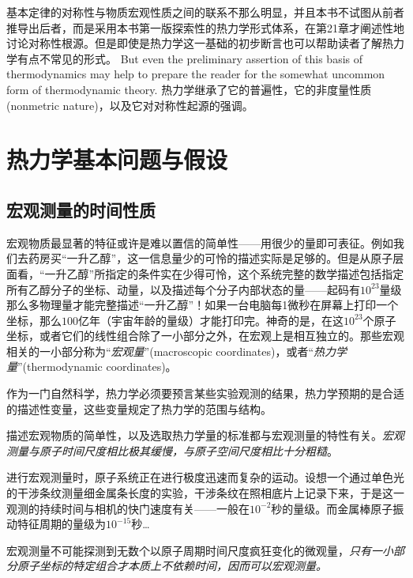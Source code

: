 基本定律的对称性与物质宏观性质之间的联系不那么明显，并且本书不试图从前者推导出后者，而是采用本书第一版探索性的热力学形式体系，在第21章才阐述性地讨论对称性根源。但是即使是热力学这一基础的初步断言也可以帮助读者了解热力学有点不常见的形式。{\color{red} But even the preliminary assertion of this basis of thermodynamics may help to prepare the reader for the somewhat uncommon form of thermodynamic theory.}  热力学继承了它的普遍性，它的非度量性质(nonmetric nature)，以及它对对称性起源的强调。

\chapter{热力学基本问题与假设}
\label{chap1}
\section{宏观测量的时间性质}
\label{sec1.1}
宏观物质最显著的特征或许是难以置信的简单性——用很少的量即可表征。例如我们去药房买“一升乙醇”，这一信息量少的可怜的描述实际是足够的。但是从原子层面看，“一升乙醇”所指定的条件实在少得可怜，这个系统完整的数学描述包括指定所有乙醇分子的坐标、动量，以及描述每个分子内部状态的量——起码有$10^{23}$量级那么多物理量才能完整描述“一升乙醇”！如果一台电脑每1微秒在屏幕上打印一个坐标，那么$100$亿年（宇宙年龄的量级）才能打印完。神奇的是，在这$10^{23}$个原子坐标，或者它们的线性组合除了一小部分之外，在宏观上是相互独立的。那些宏观相关的一小部分称为“{\it 宏观量}”(macroscopic coordinates)，或者“{\it 热力学量}”(thermodynamic coordinates)。

作为一门自然科学，热力学必须要预言某些实验观测的结果，热力学预期的是合适的描述性变量，这些变量规定了热力学的范围与结构。

描述宏观物质的简单性，以及选取热力学量的标准都与宏观测量的特性有关。{\it 宏观测量与原子时间尺度相比极其缓慢，与原子空间尺度相比十分粗糙}。

进行宏观测量时，原子系统正在进行极度迅速而复杂的运动。设想一个通过单色光的干涉条纹测量细金属条长度的实验，干涉条纹在照相底片上记录下来，于是这一观测的持续时间与相机的快门速度有关——一般在$10^{-2}$秒的量级。而金属棒原子振动特征周期的量级为$10^{-15}$秒…

宏观测量不可能探测到无数个以原子周期时间尺度疯狂变化的微观量，{\it 只有一小部分原子坐标的特定组合才本质上不依赖时间，因而可以宏观测量。}

